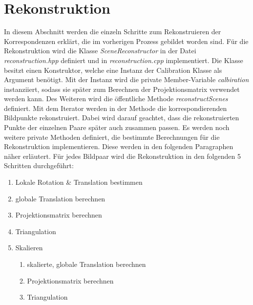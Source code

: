 \section{Rekonstruktion}\label{sec:implementation-reconstruction}

In diesem Abschnitt werden die einzeln Schritte zum Rekonstruieren der Korrespondenzen erklärt, die im vorherigen Prozess gebildet worden sind. 
Für die Rekonstruktion wird die Klasse \emph{SceneReconstructor} in der Datei \emph{reconstruction.hpp} definiert und in \emph{reconstruction.cpp} implementiert. 
Die Klasse besitzt einen Konstruktor, welche eine Instanz der Calibration Klasse als Argument benötigt. 
Mit der Instanz wird die private Member-Variable \emph{calbiration} instanziiert, sodass sie später zum Berechnen der Projektionsmatrix verwendet werden kann.
Des Weiteren wird die öffentliche Methode \emph{reconstructScenes} definiert.
Mit dem Iterator werden in der Methode die korrespondierenden Bildpunkte rekonstruiert.
Dabei wird darauf geachtet, dass die rekonstruierten Punkte der einzelnen Paare später auch zusammen passen.
Es werden noch weitere private Methoden definiert, die bestimmte Berechnungen für die Rekonstruktion implementieren.
Diese werden in den folgenden Paragraphen näher erläutert.
Für jedes Bildpaar wird die Rekonstruktion in den folgenden 5 Schritten durchgeführt:

\begin{enumerate}
    \item Lokale Rotation \& Translation bestimmen
    \item globale Translation berechnen
    \item Projektionsmatrix berechnen
    \item Triangulation
    \item Skalieren
        \begin{enumerate}
            \item skalierte, globale Translation berechnen
            \item Projektionsmatrix berechnen
            \item Triangulation
        \end{enumerate}
\end{enumerate}

